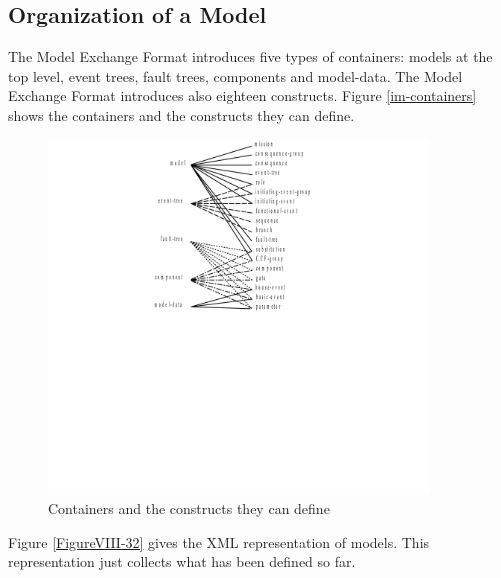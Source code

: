\documentclass[11pt]{article}
\begin{document}
\subsection{Organization of a Model}
\label{sec:orgce90fbe}

The Model Exchange Format introduces five types of containers: models
at the top level, event trees, fault trees, components and
model-data. The Model Exchange Format introduces also eighteen
constructs. Figure \ref{im-containers} shows the containers and the
constructs they can define.

\begin{figure}[htbp]

\includegraphics[width=0.9\textwidth]{./word/media/image12.png}
\caption{\label{fig:org23d0d0e}
Containers and the constructs they can define}
\end{figure}

Figure \ref{FigureVIII-32} gives the XML representation of models. This
representation just collects what has been defined so far.
\end{document}
